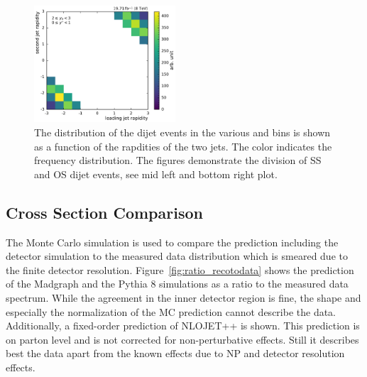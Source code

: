 \begin{figure}[htbp]
    \includegraphics[width=0.47\textwidth]{figures/measurement/jet12_rapidity_yb2ys0.pdf}
    \caption[Rapidities of the two leading jets in the various \ystar and \yboost bins]{
             The distribution of the dijet events in the various \ystar and
             \yboost bins is shown as a function of the rapdities of the two jets.
             The color indicates the frequency distribution. The figures demonstrate the
             division of SS and OS dijet events, see \eg mid left and bottom right plot.}
    \label{fig:controlplots:rapidity}
\end{figure}

\subsection{Cross Section Comparison}

The Monte Carlo simulation is used to compare the prediction including the
detector simulation to the measured data distribution which is smeared due to
the finite detector resolution. Figure~\ref{fig:ratio_recotodata} shows the
prediction of the Madgraph and the Pythia 8 simulations as a ratio to the
measured data spectrum.  While the agreement in the inner detector region is
fine, the shape and especially the normalization of the MC prediction cannot
describe the data. Additionally, a fixed-order prediction of NLOJET++ is shown.
This prediction is on parton level and is not corrected for non-perturbative
effects. Still it describes best the data apart from the known effects due to NP
and detector resolution effects.

